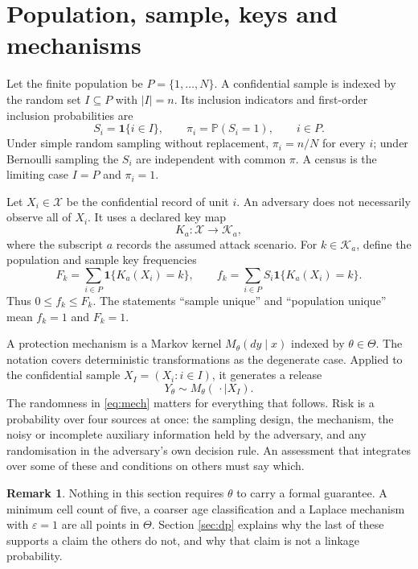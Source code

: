 \documentclass[11pt,a4paper]{article}
\theoremstyle{plain}
\theoremstyle{definition}
\newtheorem{remark}{Remark}
\theoremstyle{definition}
\theoremstyle{plain}
\newcommand{\Prob}{\mathbb{P}}
\newcommand{\ind}[1]{\mathbf{1}\{#1\}}
\begin{document}
\section{Population, sample, keys and mechanisms}\label{sec:setup}

Let the finite population be $P = \{1, \dots, N\}$. A confidential sample is
indexed by the random set $I \subseteq P$ with $|I| = n$. Its inclusion
indicators and first-order inclusion probabilities are
\begin{equation}
S_i = \ind{i \in I}, \qquad \pi_i = \Prob(S_i = 1), \qquad i \in P .
\end{equation}
Under simple random sampling without replacement, $\pi_i = n/N$ for every $i$;
under Bernoulli sampling the $S_i$ are independent with common $\pi$. A census
is the limiting case $I = P$ and $\pi_i = 1$.

Let $X_i \in \mathcal{X}$ be the confidential record of unit $i$. An adversary
does not necessarily observe all of $X_i$. It uses a declared key map
\begin{equation}
K_a : \mathcal{X} \longrightarrow \mathcal{K}_a ,
\end{equation}
where the subscript $a$ records the assumed attack scenario. For $k \in
\mathcal{K}_a$, define the population and sample key frequencies
\begin{equation}
F_k = \sum_{i \in P} \ind{K_a(X_i) = k}, \qquad
f_k = \sum_{i \in P} S_i \ind{K_a(X_i) = k} .
\label{eq:freq}
\end{equation}
Thus $0 \leq f_k \leq F_k$. The statements ``sample unique'' and ``population
unique'' mean $f_k = 1$ and $F_k = 1$.

A protection mechanism is a Markov kernel $M_\theta(dy \mid x)$ indexed by
$\theta \in \Theta$. The notation covers deterministic transformations as the
degenerate case. Applied to the confidential sample $X_I = (X_i : i \in I)$, it
generates a release
\begin{equation}
Y_\theta \sim M_\theta(\,\cdot \mid X_I) .
\label{eq:mech}
\end{equation}
The randomness in \eqref{eq:mech} matters for everything that follows. Risk is
a probability over four sources at once: the sampling design, the mechanism, the
noisy or incomplete auxiliary information held by the adversary, and any
randomisation in the adversary's own decision rule. An assessment that
integrates over some of these and conditions on others must say which.

\begin{remark}
Nothing in this section requires $\theta$ to carry a formal guarantee. A
minimum cell count of five, a coarser age classification and a Laplace mechanism
with $\varepsilon = 1$ are all points in $\Theta$. Section \ref{sec:dp} explains
why the last of these supports a claim the others do not, and why that claim is
not a linkage probability.
\end{remark}
\end{document}
